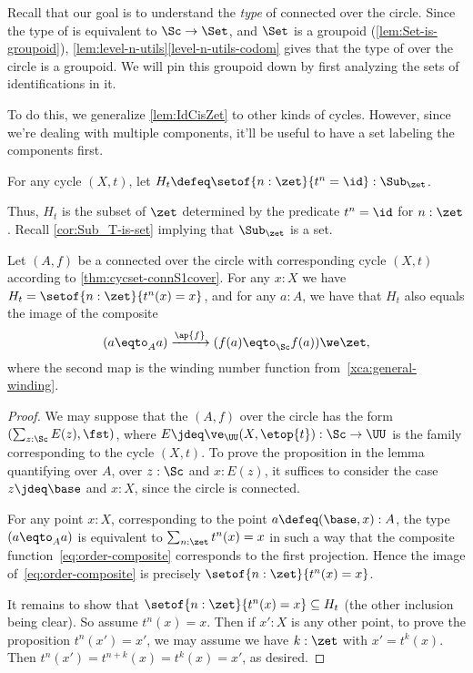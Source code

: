 Recall that our goal is to understand the \emph{type} of connected
\coverings over the circle. Since the type of \coverings is
equivalent to $\Sc\to \Set$, and $\Set$ is a groupoid
(\cref{lem:Set-is-groupoid}),
\cref{lem:level-n-utils}\ref{level-n-utils-codom} gives
that the type of \coverings over the circle is a groupoid.
We will pin this groupoid down by first analyzing the sets of
identifications in it.

To do this, we generalize \cref{lem:IdCisZet} to other kinds of cycles.
However, since we're dealing with multiple components,
it'll be useful to have a set labeling the components first.
\begin{definition}\label{def:subgroup-zet-of-cycle}
  For any cycle $(X,t)$,
  let $H_t \defeq \setof{n:\zet}{t^n=\id} : \Sub_\zet$.
\end{definition}
Thus, $H_t$ is the subset of $\zet$ determined by the predicate $t^n=\id$
for $n:\zet$.
Recall \cref{cor:Sub_T-is-set} implying that $\Sub_\zet$ is a set.
\begin{lemma}\label{lem:cycle-order-point-ap}
  Let $(A,f)$ be a connected \covering over the circle
  with corresponding cycle $(X,t)$ according to \cref{thm:cycset-connS1cover}.
  For any $x:X$ we have $H_t = \setof{n:\zet}{t^n(x)=x}$,
  and for any $a:A$, we have that $H_t$
  also equals the image of the composite
  \begin{equation}\label{eq:order-composite}
    (a \eqto_A a) \xrightarrow{\ap{f}}{} (f(a) \eqto_\Sc f(a)) \we \zet,
  \end{equation}
  where the second map is the winding number function
  from~\cref{xca:general-winding}.
\end{lemma}
\begin{proof}
  We may suppose that the \covering $(A,f)$ over the circle
  has the form $(\sum_{z:\Sc} E(z),\fst)$, where
  $E\jdeq\ve_\UU(X,\etop{t}) : \Sc\to\UU$ is the family corresponding
  to the cycle $(X,t)$.
  To prove the proposition in the lemma quantifying over $A$, \ie
  over $z:\Sc$ and $x:E(z)$, it suffices to consider the case
  $z\jdeq\base$ and $x:X$, since the circle is connected.

  For any point $x:X$, corresponding to the point $a\defeq(\base,x):A$,
  the type $(a \eqto_A a)$ is equivalent to $\sum_{n:\zet}t^n(x)=x$
  in such a way that the composite function~\eqref{eq:order-composite}
  corresponds to the first projection.
  Hence the image of~\eqref{eq:order-composite} is precisely
  $\setof{n:\zet}{t^n(x)=x}$.

  It remains to show that $\setof{n:\zet}{t^n(x)=x} \subseteq H_t$
  (the other inclusion being clear).
  So assume $t^n(x)=x$.
  Then if $x':X$ is any other point, to prove the proposition
  $t^n(x')=x'$, we may assume we have $k:\zet$ with $x'=t^k(x)$. Then
  $t^n(x')=t^{n+k}(x)=t^k(x)=x'$, as desired.
\end{proof}

